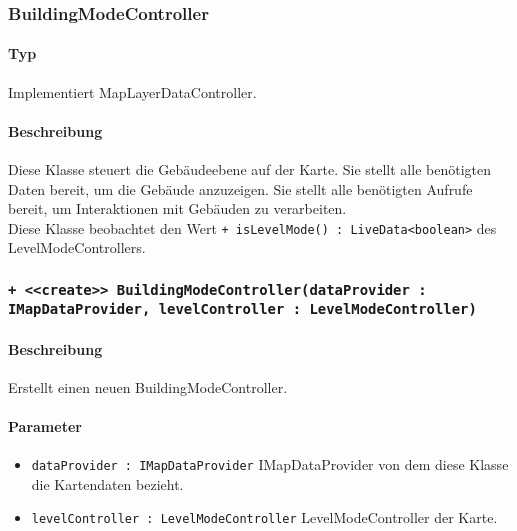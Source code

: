 \subsubsection{BuildingModeController}
\paragraph*{Typ}
Implementiert MapLayerDataController.
\paragraph*{Beschreibung}
Diese Klasse steuert die Gebäudeebene auf der Karte. Sie stellt alle benötigten Daten bereit, um die Gebäude anzuzeigen. 
Sie stellt alle benötigten Aufrufe bereit, um Interaktionen mit Gebäuden zu verarbeiten.\\
Diese Klasse beobachtet den Wert \texttt{+ isLevelMode() : LiveData<boolean>} des LevelModeControllers.

\subsubsection*{\texttt{+ <<create>> BuildingModeController(dataProvider : IMapDataProvider, levelController : LevelModeController)}}%
\paragraph*{Beschreibung}
Erstellt einen neuen BuildingModeController.
\paragraph*{Parameter}
\begin{itemize}
    \item \texttt{dataProvider : IMapDataProvider} IMapDataProvider von dem diese Klasse die Kartendaten bezieht.
    \item \texttt{levelController : LevelModeController} LevelModeController der Karte.
\end{itemize}
